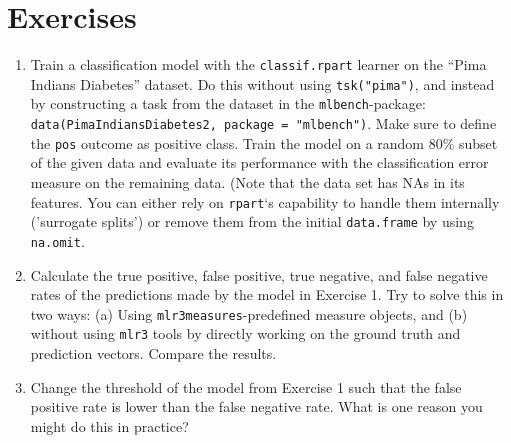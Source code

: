 \hypertarget{exercises}{%
\section{Exercises}\label{exercises}}

\begin{enumerate}
\def\labelenumi{\arabic{enumi}.}
\tightlist
\item
  Train a classification model with the \texttt{classif.rpart} learner
  on the ``Pima Indians Diabetes'' dataset. Do this without using
  \texttt{tsk("pima")}, and instead by constructing a task from the
  dataset in the \texttt{mlbench}-package:
  \texttt{data(PimaIndiansDiabetes2,\ package\ =\ "mlbench")}. Make sure
  to define the \texttt{pos} outcome as positive class. Train the model
  on a random 80\% subset of the given data and evaluate its performance
  with the classification error measure on the remaining data. (Note
  that the data set has NAs in its features. You can either rely on
  \texttt{rpart}`s capability to handle them internally ('surrogate
  splits') or remove them from the initial \texttt{data.frame} by using
  \texttt{na.omit}.
\item
  Calculate the true positive, false positive, true negative, and false
  negative rates of the predictions made by the model in Exercise 1. Try
  to solve this in two ways: (a) Using \texttt{mlr3measures}-predefined
  measure objects, and (b) without using \texttt{mlr3} tools by directly
  working on the ground truth and prediction vectors. Compare the
  results.
\item
  Change the threshold of the model from Exercise 1 such that the false
  positive rate is lower than the false negative rate. What is one
  reason you might do this in practice?
\end{enumerate}
